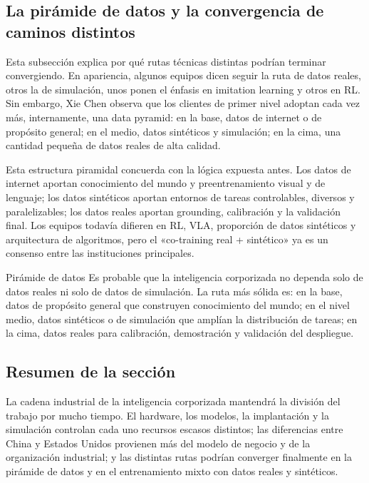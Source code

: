\subsection{La pirámide de datos y la convergencia de caminos distintos}

Esta subsección explica por qué rutas técnicas distintas podrían terminar convergiendo. En apariencia, algunos equipos dicen seguir la ruta de datos reales, otros la de simulación, unos ponen el énfasis en imitation learning y otros en RL. Sin embargo, Xie Chen observa que los clientes de primer nivel adoptan cada vez más, internamente, una data pyramid: en la base, datos de internet o de propósito general; en el medio, datos sintéticos y simulación; en la cima, una cantidad pequeña de datos reales de alta calidad.

Esta estructura piramidal concuerda con la lógica expuesta antes. Los datos de internet aportan conocimiento del mundo y preentrenamiento visual y de lenguaje; los datos sintéticos aportan entornos de tareas controlables, diversos y paralelizables; los datos reales aportan grounding, calibración y la validación final. Los equipos todavía difieren en RL, VLA, proporción de datos sintéticos y arquitectura de algoritmos, pero el «co-training real + sintético» ya es un consenso entre las instituciones principales.

\begin{importantbox}{Pirámide de datos}
Es probable que la inteligencia corporizada no dependa solo de datos reales ni solo de datos de simulación. La ruta más sólida es: en la base, datos de propósito general que construyen conocimiento del mundo; en el nivel medio, datos sintéticos o de simulación que amplían la distribución de tareas; en la cima, datos reales para calibración, demostración y validación del despliegue.
\end{importantbox}

\subsection{Resumen de la sección}

La cadena industrial de la inteligencia corporizada mantendrá la división del trabajo por mucho tiempo. El hardware, los modelos, la implantación y la simulación controlan cada uno recursos escasos distintos; las diferencias entre China y Estados Unidos provienen más del modelo de negocio y de la organización industrial; y las distintas rutas podrían converger finalmente en la pirámide de datos y en el entrenamiento mixto con datos reales y sintéticos.
